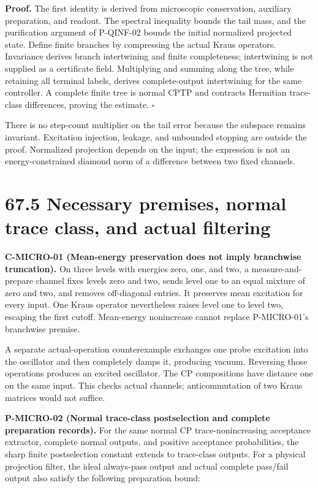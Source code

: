 \documentclass[
  11pt,
  oneside]{book}
\begin{document}
\textbf{Proof.} The first identity is derived from microscopic
conservation, auxiliary preparation, and readout. The spectral
inequality bounds the tail mass, and the purification argument of
P-QINF-02 bounds the initial normalized projected state. Define finite
branches by compressing the actual Kraus operators. Invariance derives
branch intertwining and finite completeness; intertwining is not
supplied as a certificate field. Multiplying and summing along the tree,
while retaining all terminal labels, derives complete-output
intertwining for the same controller. A complete finite tree is normal
CPTP and contracts Hermitian trace-class differences, proving the
estimate. \(\square\)

There is no step-count multiplier on the tail error because the subspace
remains invariant. Excitation injection, leakage, and unbounded stopping
are outside the proof. Normalized projection depends on the input; the
expression is not an energy-constrained diamond norm of a difference
between two fixed channels.

\section{67.5 Necessary premises, normal trace class, and actual
filtering}

\label{c-micro-01}{}

\textbf{C-MICRO-01 (Mean-energy preservation does not imply branchwise
truncation).} On three levels with energies zero, one, and two, a
measure-and-prepare channel fixes levels zero and two, sends level one
to an equal mixture of zero and two, and removes off-diagonal entries.
It preserves mean excitation for every input. One Kraus operator
nevertheless raises level one to level two, escaping the first cutoff.
Mean-energy nonincrease cannot replace P-MICRO-01's branchwise premise.

A separate actual-operation counterexample exchanges one probe
excitation into the oscillator and then completely damps it, producing
vacuum. Reversing those operations produces an excited oscillator. The
CP compositions have distance one on the same input. This checks actual
channels; anticommutation of two Kraus matrices would not suffice.

\label{p-micro-02}{}

\textbf{P-MICRO-02 (Normal trace-class postselection and complete
preparation records).} For the same normal CP trace-nonincreasing
acceptance extractor, complete normal outputs, and positive acceptance
probabilities, the sharp finite postselection constant extends to
trace-class outputs. For a physical projection filter, the ideal
always-pass output and actual complete pass/fail output also satisfy the
following preparation bound:
\end{document}
